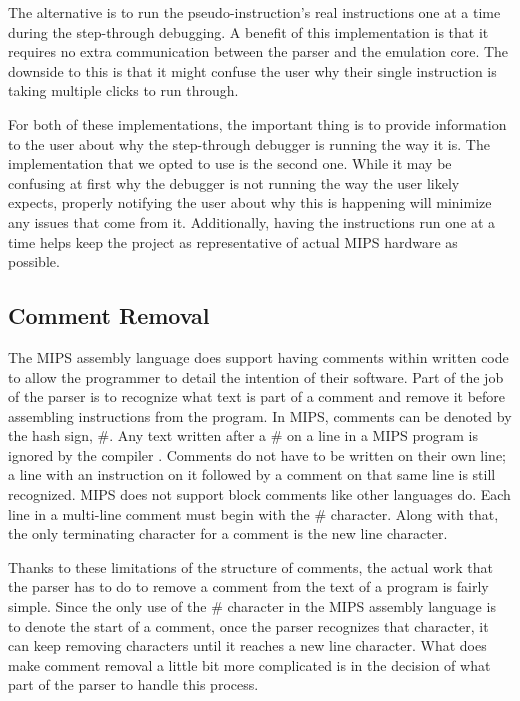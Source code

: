 \documentclass[
    parskip=half,
    fontsize=12pt,
    titlepage=firstiscover,
    toc=bibliography,
    numbers=endperiod
]{scrartcl}
\begin{document}
The alternative is to run the pseudo-instruction's real instructions one
at a time during the step-through debugging. A benefit of this
implementation is that it requires no extra communication between the
parser and the emulation core. The downside to this is that it might
confuse the user why their single instruction is taking multiple clicks
to run through.

For both of these implementations, the important thing is to provide
information to the user about why the step-through debugger is running
the way it is. The implementation that we opted to use is the second
one. While it may be confusing at first why the debugger is not running
the way the user likely expects, properly notifying the user about why
this is happening will minimize any issues that come from it.
Additionally, having the instructions run one at a time helps keep the
project as representative of actual MIPS hardware as possible.

\subsection{Comment Removal}

The MIPS assembly language does support having comments within written
code to allow the programmer to detail the intention of their software.
Part of the job of the parser is to recognize what text is part of a
comment and remove it before assembling instructions from the program.
In MIPS, comments can be denoted by the hash sign, \#. Any text written
after a \# on a line in a MIPS program is ignored by the compiler \cite{wikibooks-mips-instructions}.
Comments do not have to be written on their own line; a line with an
instruction on it followed by a comment on that same line is still
recognized. MIPS does not support block comments like other languages
do. Each line in a multi-line comment must begin with the \# character.
Along with that, the only terminating character for a comment is the new
line character.

Thanks to these limitations of the structure of comments, the actual
work that the parser has to do to remove a comment from the text of a
program is fairly simple. Since the only use of the \# character in the
MIPS assembly language is to denote the start of a comment, once the
parser recognizes that character, it can keep removing characters until
it reaches a new line character. What does make comment removal a little
bit more complicated is in the decision of what part of the parser to
handle this process.
\end{document}
